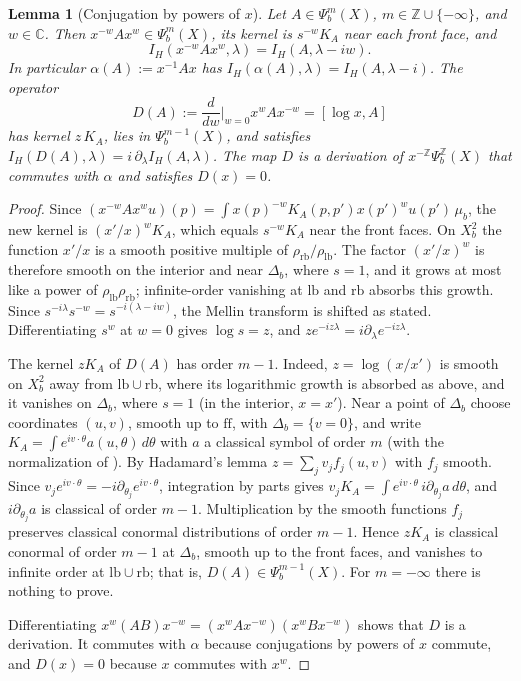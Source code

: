 \documentclass[11pt,oneside,reqno]{article}
\newcommand{\C}{\mathbb C}
\newcommand{\Z}{\mathbb Z}
\theoremstyle{plain}
\newtheorem{lemma}[theorem]{Lemma}
\theoremstyle{definition}
\theoremstyle{remark}
\begin{document}
\begin{lemma}[Conjugation by powers of \(x\)]\label{lem:conj}
Let \(A\in\Psi_b^m(X)\), \(m\in\Z\cup\{-\infty\}\), and \(w\in\C\). Then
\(x^{-w}Ax^{w}\in\Psi_b^m(X)\), its kernel is \(s^{-w}K_A\) near each front
face, and
\[
 I_H(x^{-w}Ax^{w},\lambda)=I_H(A,\lambda-iw).
\]
In particular \(\alpha(A):=x^{-1}Ax\) has \(I_H(\alpha(A),\lambda)=
I_H(A,\lambda-i)\). The operator
\[
 D(A):=\frac{d}{dw}\Big|_{w=0}x^{w}Ax^{-w}=[\log x,A]
\]
has kernel \(z\,K_A\), lies in \(\Psi_b^{m-1}(X)\), and satisfies
\(I_H(D(A),\lambda)=i\,\partial_\lambda I_H(A,\lambda)\). The map \(D\) is a
derivation of \(x^{-\Z}\Psi_b^{\Z}(X)\) that commutes with \(\alpha\) and
satisfies \(D(x)=0\).
\end{lemma}

\begin{proof}
Since \((x^{-w}Ax^{w}u)(p)=\int x(p)^{-w}K_A(p,p')x(p')^{w}u(p')\,\mu_b\),
the new kernel is \((x'/x)^wK_A\), which equals \(s^{-w}K_A\) near the front
faces. On \(X_b^2\) the function \(x'/x\) is a smooth positive multiple of
\(\rho_{\mathrm{rb}}/\rho_{\mathrm{lb}}\). The factor \((x'/x)^w\) is
therefore smooth on the interior and near \(\Delta_b\), where \(s=1\), and
it grows at most like a power of \(\rho_{\mathrm{lb}}\rho_{\mathrm{rb}}\);
infinite-order vanishing at \(\mathrm{lb}\) and \(\mathrm{rb}\) absorbs this
growth. Since \(s^{-i\lambda}s^{-w}=s^{-i(\lambda-iw)}\), the Mellin
transform is shifted as stated. Differentiating \(s^{w}\) at \(w=0\) gives
\(\log s=z\), and \(ze^{-iz\lambda}=i\partial_\lambda e^{-iz\lambda}\).

The kernel \(zK_A\) of \(D(A)\) has order \(m-1\). Indeed, \(z=\log(x/x')\)
is smooth on \(X_b^2\) away from \(\mathrm{lb}\cup\mathrm{rb}\), where its
logarithmic growth is absorbed as above, and it vanishes on \(\Delta_b\),
where \(s=1\) (in the interior, \(x=x'\)). Near a point of \(\Delta_b\)
choose coordinates \((u,v)\), smooth up to \(\mathrm{ff}\), with
\(\Delta_b=\{v=0\}\), and write
\(K_A=\int e^{iv\cdot\theta}a(u,\theta)\,d\theta\) with \(a\) a classical
symbol of order \(m\) (with the normalization of
\cite{Notes}). By Hadamard's lemma
\(z=\sum_jv_jf_j(u,v)\) with \(f_j\) smooth. Since
\(v_je^{iv\cdot\theta}=-i\partial_{\theta_j}e^{iv\cdot\theta}\), integration
by parts gives \(v_jK_A=\int e^{iv\cdot\theta}\,i\partial_{\theta_j}a\,
d\theta\), and \(i\partial_{\theta_j}a\) is classical of order \(m-1\).
Multiplication by the smooth functions \(f_j\) preserves classical conormal
distributions of order \(m-1\). Hence \(zK_A\) is classical conormal of order
\(m-1\) at \(\Delta_b\), smooth up to the front faces, and vanishes to
infinite order at \(\mathrm{lb}\cup\mathrm{rb}\); that is,
\(D(A)\in\Psi_b^{m-1}(X)\). For \(m=-\infty\) there is nothing to prove.

Differentiating \(x^w(AB)x^{-w}=(x^wAx^{-w})(x^wBx^{-w})\) shows that \(D\)
is a derivation. It commutes with \(\alpha\) because conjugations by powers
of \(x\) commute, and \(D(x)=0\) because \(x\) commutes with \(x^w\).
\end{proof}
\end{document}
